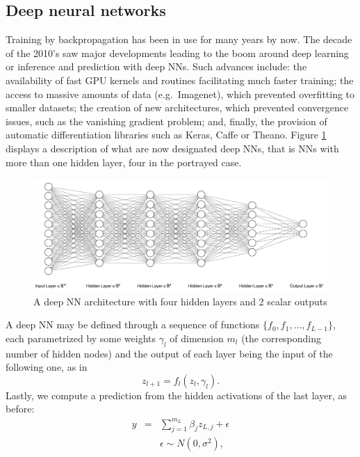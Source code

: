 \subsection{Deep neural networks}\label{sec:dnn_examples}

Training by backpropagation has been in use 
for many years by now.
The decade of the 2010's saw major developments
leading to 
the boom around deep learning \parencite{deeplearningbook}
or inference and prediction with deep NNs. 
Such advances include:
the availability of fast GPU kernels and routines
facilitating much faster training;
the access to massive amounts of data (e.g.\ Imagenet), which prevented overfitting to smaller datasets; 
the creation of new architectures, which prevented  convergence issues, such as the vanishing gradient problem; 
and, finally, the provision of automatic differentiation libraries such as Keras, Caffe or Theano.
Figure \ref{figuradkk} displays a description
of what are now designated 
deep NNs, that is NNs with more than one hidden
layer, four in the portrayed case.
\begin{figure}
    \centering
    \includegraphics[scale=0.35]{figures/net2.png}
    \caption{A deep NN architecture with four hidden layers and 2 scalar outputs}
    \label{figuradkk}
\end{figure}


A deep NN may be defined through   
a sequence of functions $\lbrace f_0, f_1, ..., f_{L-1} \rbrace$, each parametrized by some weights $\gamma_l$
of dimension $m_l$  (the corresponding number of hidden nodes) and the output of each layer being the input of the following one, as in
$$
    z_{l+1} = f_l ( z_l, \gamma_l).
$$
Lastly, we compute a prediction from the hidden activations of the last layer, as before:
\begin{eqnarray}
y         & = & \sum_{j=1}^{m_L} \beta_j z_{L,j} +
                    \epsilon %
                    \nonumber\\
              & & \epsilon \sim N(0,\sigma^2),
                  \nonumber \\
\end{eqnarray}

